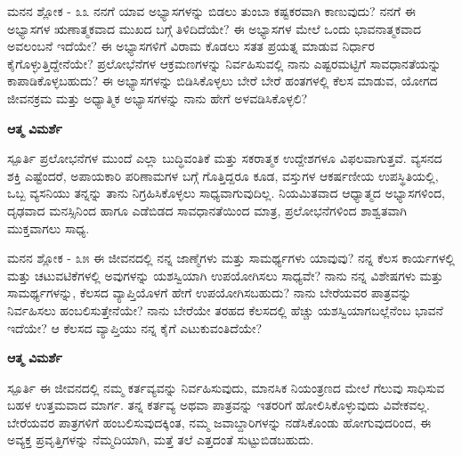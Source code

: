 \begin{mananam}{\mananamfont ಮನನ ಶ್ಲೋಕ - ೩೩}
\mananamtext ನನಗೆ ಯಾವ ಅಭ್ಯಾಸಗಳನ್ನು ಬಿಡಲು ತುಂಬಾ ಕಷ್ಟಕರವಾಗಿ ಕಾಣುವುದು? ನನಗೆ ಈ ಅಭ್ಯಾಸಗಳ ಋಣಾತ್ಮಕವಾದ ಮುಖದ ಬಗ್ಗೆ ತಿಳಿದಿದೆಯೇ? ಈ ಅಭ್ಯಾಸಗಳ ಮೇಲೆ ಒಂದು ಭಾವನಾತ್ಮಕವಾದ ಅವಲಂಬನೆ ಇದೆಯೇ? ಈ ಅಭ್ಯಾಸಗಳಿಗೆ ವಿರಾಮ ಕೊಡಲು ಸತತ ಪ್ರಯತ್ನ ಮಾಡುವ ನಿರ್ಧಾರ ಕೈಗೊಳ್ಳುತ್ತಿದ್ದೇನೆಯೇ? ಪ್ರಲೋಭೆನೆಗಳ ಆಕ್ರಮಣಗಳನ್ನು ನಿರ್ವಹಿಸುವಲ್ಲಿ ನಾನು ಎಷ್ಟರಮಟ್ಟಿಗೆ ಸಾವಧಾನತೆಯನ್ನು ಕಾಪಾಡಿಕೊಳ್ಳಬಹುದು? ಈ ಅಭ್ಯಾಸಗಳನ್ನು ಬಿಡಿಸಿಕೊಳ್ಳಲು ಬೇರೆ ಬೇರೆ ಹಂತಗಳಲ್ಲಿ ಕೆಲಸ ಮಾಡುವ, ಯೋಗದ ಜೀವನಕ್ರಮ ಮತ್ತು ಅಧ್ಯಾತ್ಮಿಕ ಅಭ್ಯಾಸಗಳನ್ನು ನಾನು ಹೇಗೆ ಅಳವಡಿಸಿಕೊಳ್ಳಲಿ?
\end{mananam}
\WritingHand\enspace\textbf{ಆತ್ಮ ವಿಮರ್ಶೆ}\\
\begin{inspiration}{\mananamfont ಸ್ಪೂರ್ತಿ}
\mananamtext ಪ್ರಲೋಭನೆಗಳ ಮುಂದೆ ಎಲ್ಲಾ ಬುದ್ಧಿವಂತಿಕೆ ಮತ್ತು ಸಕರಾತ್ಮಕ ಉದ್ದೇಶಗಳೂ ವಿಫಲವಾಗುತ್ತವೆ. ವ್ಯಸನದ ಶಕ್ತಿ ಎಷ್ಟೆಂದರೆ, ಅಪಾಯಕಾರಿ ಪರಿಣಾಮಗಳ ಬಗ್ಗೆ ಗೊತ್ತಿದ್ದರೂ ಕೂಡ, ವಸ್ತುಗಳ ಆಕರ್ಷಣೀಯ ಉಪಸ್ಥಿತಿಯಲ್ಲಿ, ಒಬ್ಬ ವ್ಯಸನಿಯು ತನ್ನನ್ನು ತಾನು ನಿಗ್ರಹಿಸಿಕೊಳ್ಳಲು ಸಾಧ್ಯವಾಗುವುದಿಲ್ಲ. ನಿಯಮಿತವಾದ ಆಧ್ಯಾತ್ಮದ ಅಭ್ಯಾಸಗಳಿಂದ, ದೃಢವಾದ ಮನಸ್ಸಿನಿಂದ ಹಾಗೂ ಎಡೆಬಿಡದ ಸಾವಧಾನತೆಯಿಂದ ಮಾತ್ರ, ಪ್ರಲೋಭನೆಗಳಿಂದ ಶಾಶ್ವತವಾಗಿ ಮುಕ್ತವಾಗಲು ಸಾಧ್ಯ.
\end{inspiration}
\newpage

\begin{mananam}{\mananamfont ಮನನ ಶ್ಲೋಕ - ೩೫}
\mananamtext ಈ ಜೀವನದಲ್ಲಿ ನನ್ನ ಜಾಣ್ಮೆಗಳು ಮತ್ತು ಸಾಮರ್ಥ್ಯಗಳು ಯಾವುವು? ನನ್ನ ಕೆಲಸ ಕಾರ್ಯಗಳಲ್ಲಿ ಮತ್ತು ಚಟುವಟಿಕೆಗಳಲ್ಲಿ ಅವುಗಳನ್ನು ಯಶಸ್ವಿಯಾಗಿ ಉಪಯೋಗಿಸಲು ಸಾಧ್ಯವೇ? ನಾನು ನನ್ನ ವಿಶೇಷಗಳು ಮತ್ತು ಸಾಮರ್ಥ್ಯಗಳನ್ನು, ಕೆಲಸದ ವ್ಯಾಪ್ತಿಯೊಳಗೆ ಹೇಗೆ ಉಪಯೋಗಿಸಬಹುದು? ನಾನು ಬೇರೆಯವರ ಪಾತ್ರವನ್ನು ನಿರ್ವಹಿಸಲು ಹಂಬಲಿಸುತ್ತೇನೆಯೇ? ನಾನು ಬೇರೆಯೇ ತರಹದ ಕೆಲಸದಲ್ಲಿ ಹೆಚ್ಚು ಯಶಸ್ವಿಯಾಗಬಲ್ಲೆನೆಂಬ ಭಾವನೆ ಇದೆಯೇ? ಆ ಕೆಲಸದ ವ್ಯಾಪ್ತಿಯು ನನ್ನ ಕೈಗೆ ಎಟುಕುವಂತಿದೆಯೇ? 
\end{mananam}
\WritingHand\enspace\textbf{ಆತ್ಮ ವಿಮರ್ಶೆ}\\
\begin{inspiration}{\mananamfont ಸ್ಪೂರ್ತಿ}
\mananamtext ಈ ಜೀವನದಲ್ಲಿ ನಮ್ಮ ಕರ್ತವ್ಯವನ್ನು ನಿರ್ವಹಿಸುವುದು, ಮಾನಸಿಕ ನಿಯಂತ್ರಣದ ಮೇಲೆ ಗೆಲುವು ಸಾಧಿಸುವ ಬಹಳ ಉತ್ತಮವಾದ ಮಾರ್ಗ. ತನ್ನ ಕರ್ತವ್ಯ ಅಥವಾ ಪಾತ್ರವನ್ನು ಇತರರಿಗೆ ಹೋಲಿಸಿಕೊಳ್ಳುವುದು ವಿವೇಕವಲ್ಲ. ಬೇರೆಯವರ ಪಾತ್ರಗಳಿಗೆ ಹಂಬಲಿಸುವುದಕ್ಕಿಂತ, ನಮ್ಮ ಜವಾಬ್ದಾರಿಗಳನ್ನು ನಡೆಸಿಕೊಂಡು ಹೋಗುವುದರಿಂದ, ಈ ಅವ್ಯಕ್ತ ಪ್ರವೃತ್ತಿಗಳನ್ನು ನೆಮ್ಮದಿಯಾಗಿ, ಮತ್ತೆ ತಲೆ ಎತ್ತದಂತೆ ಸುಟ್ಟುಬಿಡಬಹುದು.
\end{inspiration}
\newpage

